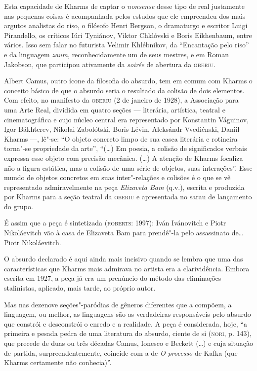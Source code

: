 Esta capacidade de Kharms de captar o \emph{nonsense} desse tipo de real
justamente nas pequenas coisas é acompanhada pelos estudos que ele
empreendeu dos mais argutos analistas do riso, o filósofo Henri Bergson,
o dramaturgo e escritor Luigi Pirandello, os críticos Iúri Tyniánov,
Viktor Chklóvski e Boris Eikhenbaum, entre vários. Isso sem falar no
futurista Velimir Khlébnikov, da ``Encantação pelo riso'' e da linguagem
\emph{zaum}, reconhecidamente um de seus mestres, e em Roman Jakobson,
que participou ativamente da \emph{soirée} de abertura da
\textsc{oberiu}.

Albert Camus, outro ícone da filosofia do absurdo, tem em comum com
Kharms o conceito básico de que o absurdo seria o resultado da colisão
de dois elementos. Com efeito, no manifesto da \textsc{oberiu} (2 de
janeiro de 1928), a Associação para uma Arte Real, dividida em quatro
seções --- literária, artística, teatral e cinematográfica e cujo núcleo
central era representado por Konstantin Váguinov, Igor Bákhterev,
Nikolai Zabolótski, Boris Lévin, Aleksándr Vvediénski, Daniil Kharms ---, lê"-se: ``O objeto concreto limpo de sua casca literária e rotineira
torna"-se propriedade da arte'', ``(\ldots{}) Em poesia, a colisão de
significados verbais expressa esse objeto com precisão mecânica.
(\ldots{}) A atenção de Kharms focaliza não a figura estática, mas a
colisão de uma série de objetos, suas interações''. Esse mundo de
objetos concretos em suas inter"-relações e colisões é o que se vê
representado admiravelmente na peça \emph{Elizaveta Bam} (q.v.), escrita
e produzida por Kharms para a seção teatral da \textsc{oberiu} e
apresentada no sarau de lançamento do grupo.

É assim que a peça é sintetizada (\textsc{roberts}: 1997): Iván
Ivánovitch e Piotr Nikoláevitch vão à casa de Elizaveta Bam para
prendê"-la pelo assassinato de\ldots{} Piotr Nikoláevitch.

O absurdo declarado é aqui ainda mais incisivo quando se lembra que uma
das características que Kharms mais admirava no artista era a
clarividência. Embora escrita em 1927, a peça já era um prenúncio do
método das eliminações stalinistas, aplicado, mais tarde, ao próprio
autor.

Mas nas dezenove seções"-paródias de gêneros diferentes que a compõem, a
linguagem, ou melhor, as linguagens são as verdadeiras responsáveis pelo
absurdo que constrói e desconstrói o enredo e a realidade. A peça é
considerada, hoje, ``a primeira e pesada pedra de uma literatura do
absurdo, ciente de si (\textsc{nori}, p. 143), que precede de duas ou
três décadas Camus, Ionesco e Beckett (\ldots{}) e cuja situação de
partida, surpreendentemente, coincide com a de \emph{O processo}
de Kafka (que Kharms certamente não conhecia)''.

